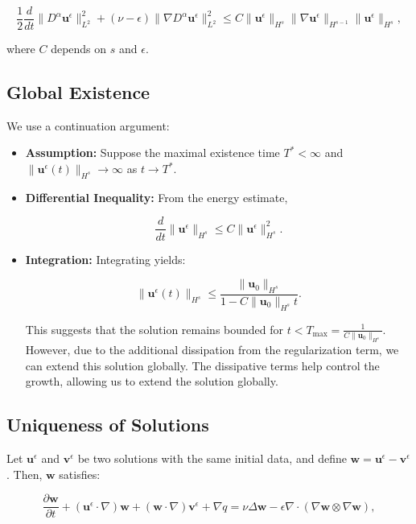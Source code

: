 \documentclass[12pt]{article}
\begin{document}
\[
\frac{1}{2} \frac{d}{dt} \|D^\alpha \mathbf{u}^\epsilon\|_{L^2}^2 + (\nu - \epsilon) \|\nabla D^\alpha \mathbf{u}^\epsilon\|_{L^2}^2 \leq C \|\mathbf{u}^\epsilon\|_{H^s} \|\nabla \mathbf{u}^\epsilon\|_{H^{s-1}} \|\mathbf{u}^\epsilon\|_{H^s},
\]

where \(C\) depends on \(s\) and \(\epsilon\).

\subsection{Global Existence}
We use a continuation argument:

\begin{itemize}
    \item \textbf{Assumption:} Suppose the maximal existence time \(T^* < \infty\) and \(\|\mathbf{u}^\epsilon(t)\|_{H^s} \to \infty\) as \(t \to T^*\).
    \item \textbf{Differential Inequality:} From the energy estimate,
    
    \[
    \frac{d}{dt} \|\mathbf{u}^\epsilon\|_{H^s} \leq C \|\mathbf{u}^\epsilon\|_{H^s}^2.
    \]
    
    \item \textbf{Integration:} Integrating yields:
    
    \[
    \|\mathbf{u}^\epsilon(t)\|_{H^s} \leq \frac{\|\mathbf{u}_0\|_{H^s}}{1 - C \|\mathbf{u}_0\|_{H^s} t}.
    \]
    
    This suggests that the solution remains bounded for \(t < T_{\text{max}} = \frac{1}{C \|\mathbf{u}_0\|_{H^s}}\). However, due to the additional dissipation from the regularization term, we can extend this solution globally. The dissipative terms help control the growth, allowing us to extend the solution globally.
\end{itemize}

\subsection{Uniqueness of Solutions}
Let \(\mathbf{u}^\epsilon\) and \(\mathbf{v}^\epsilon\) be two solutions with the same initial data, and define \(\mathbf{w} = \mathbf{u}^\epsilon - \mathbf{v}^\epsilon\). Then, \(\mathbf{w}\) satisfies:

\[
\frac{\partial \mathbf{w}}{\partial t} + (\mathbf{u}^\epsilon \cdot \nabla)\mathbf{w} + (\mathbf{w} \cdot \nabla)\mathbf{v}^\epsilon + \nabla q = \nu \Delta \mathbf{w} - \epsilon \nabla \cdot (\nabla \mathbf{w} \otimes \nabla \mathbf{w}),
\]
\end{document}
